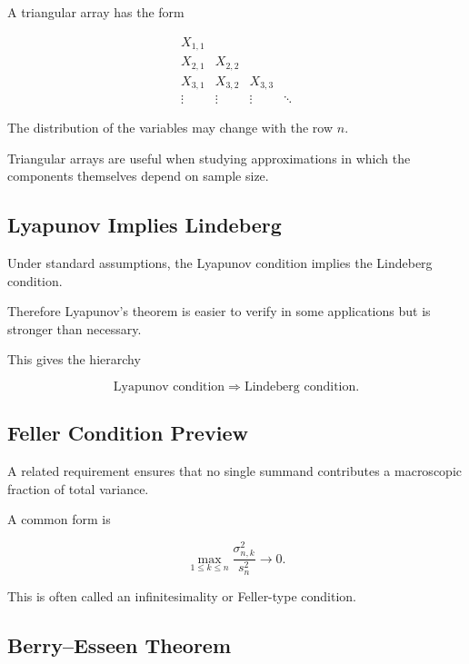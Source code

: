 A triangular array has the form

\[
\begin{array}{cccccc}
X_{1,1}
\\
X_{2,1}
&
X_{2,2}
\\
X_{3,1}
&
X_{3,2}
&
X_{3,3}
\\
\vdots
&
\vdots
&
\vdots
&
\ddots
\end{array}
\]

The distribution of the variables may change with the row \(n\).

Triangular arrays are useful when studying approximations in which the
components themselves depend on sample size.

\subsection{Lyapunov Implies Lindeberg}
\label{subsec:lyapunov-implies-lindeberg}

Under standard assumptions, the Lyapunov condition implies the
Lindeberg condition.

Therefore Lyapunov's theorem is easier to verify in some applications
but is stronger than necessary.

This gives the hierarchy

\[
\boxed{
\text{Lyapunov condition}
\Longrightarrow
\text{Lindeberg condition}.
}
\]

\subsection{Feller Condition Preview}
\label{subsec:feller-condition}

A related requirement ensures that no single summand contributes a
macroscopic fraction of total variance.

A common form is

\[
\boxed{
\max_{1\leq k\leq n}
\frac{
\sigma_{n,k}^2
}{
s_n^2
}
\to0.
}
\]

This is often called an infinitesimality or Feller-type condition.

\subsection{Berry--Esseen Theorem}
\label{subsec:berry-esseen}


